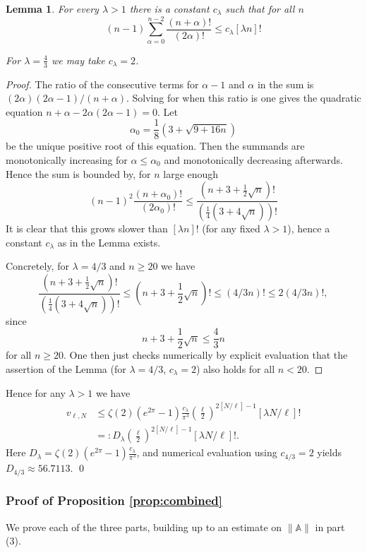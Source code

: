 \documentclass[12pt]{amsart}
\newtheorem{lem}[thm]{Lemma}
\theoremstyle{definition}
\numberwithin{equation}{section}
\theoremstyle{definition} %
\theoremstyle{remark}
\begin{document}
\begin{lem}
For every $\lambda>1$ there is a constant $c_\lambda$ such that for all $n$
\[
    (n-1) \sum_{\alpha=0}^{n - 2} 
    \frac{(n +\alpha )!}
    {(2\alpha)!} 
    \leq c_\lambda [\lambda n]!
\]

For $\lambda=\frac43$ we may take $c_\lambda=2$.
\end{lem}
\begin{proof}
    The ratio of the consecutive terms for $\alpha - 1$ and $\alpha$ in the sum is $(2\alpha)(2\alpha - 1)/(n + \alpha)$. Solving for when this ratio is one gives the quadratic equation $n+\alpha- 2\alpha (2\alpha-1) = 0$.
    Let
    \[
    \alpha_0=\frac 18(3+\sqrt{9+16n})
    \]
    be the unique positive root of this equation.
    Then the summands are monotonically increasing for $\alpha\leq \alpha_0$ and monotonically decreasing afterwards.
    Hence the sum is bounded by, for $n$ large enough
    \[
    (n-1)^2 \frac{(n+\alpha_0)!}{(2\alpha_0)!}
    \leq \frac{(n+3+\frac12\sqrt{n})!}{(\frac14(3+4\sqrt{n}))!}
    \]
    It is clear that this grows slower than $[\lambda n]!$ (for any fixed $\lambda>1$), hence a constant $c_\lambda$ as in the Lemma exists.

    Concretely, for $\lambda=4/3$ and $n\geq 20$ we have 
    \[
        \frac{(n+3+\frac12\sqrt{n})!}{(\frac14(3+4\sqrt{n}))!}
        \leq 
        (n+3+\frac12\sqrt{n})!
        \leq 
        (4/3 n)!
        \leq 2
        (4/3 n)!,
    \]
    since 
    \[
        n+3+\frac12\sqrt{n} \leq \frac43 n
    \]
    for all $n\geq 20$.
    One then just checks numerically by explicit evaluation that the assertion of the Lemma (for $\lambda=4/3$, $c_\lambda=2$) also holds for all $n<20$.
\end{proof}

Hence for any $\lambda>1$ we have
\begin{align*}
    v_{\ell,N}
    &\leq 
  \zeta(2) (e^{2\pi}-1)
  \frac{c_\lambda}{ \pi^3}
  \left(\frac{\ell}{2}\right)^{2[N/\ell]-1}
  [\lambda N/\ell]!
  \\&=: D_\lambda 
  \left(\frac{\ell}{2}\right)^{2[N/\ell]-1}
  [\lambda N/\ell]!
  .
\end{align*}
Here $D_\lambda=\zeta(2) (e^{2\pi}-1)
\frac{c_\lambda}{ \pi^3}$, and numerical evaluation using $c_{4/3}=2$ yields $D_{4/3}\approx 56.7113$. 
\hfill\qed

\subsubsection{Proof of Proposition \ref{prop:combined}}
We prove each of the three parts, building up to an estimate on $\|\mathbb{A}\|$ in part (3).
\end{document}
